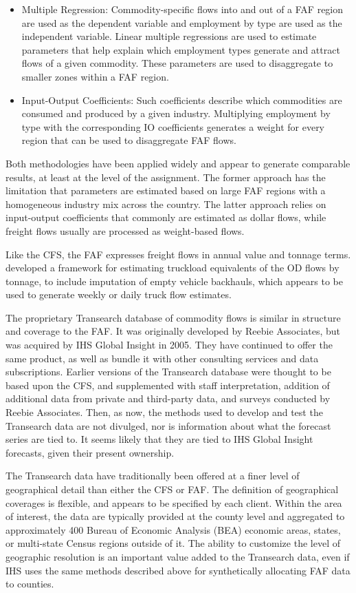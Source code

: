 \begin{itemize}
\item
Multiple Regression: Commodity-specific flows into and out of a FAF region are used as the dependent variable and employment by type are used as the independent variable. Linear multiple regressions are used to estimate parameters that help explain which employment types generate and attract flows of a given commodity. These parameters are used to disaggregate to smaller zones within a FAF region.
\item
Input-Output Coefficients: Such coefficients describe which commodities are consumed and produced by a given industry. Multiplying employment by type with the corresponding IO coefficients generates a weight for every region that can be used to disaggregate FAF flows.
\end{itemize}

Both methodologies have been applied widely and appear to generate comparable results, at least at the level of the assignment. The former approach has the limitation that parameters are estimated based on large FAF regions with a homogeneous industry mix across the country. The latter approach relies on input-output coefficients that commonly are estimated as dollar flows, while freight flows usually are processed as weight-based flows.

Like the CFS, the FAF expresses freight flows in annual value and tonnage terms. \cite{battelle12} developed a framework for estimating truckload equivalents of the OD flows by tonnage, to include imputation of empty vehicle backhauls, which appears to be used to generate weekly or daily truck flow estimates.

The proprietary Transearch database of commodity flows is similar in structure and coverage to the FAF. It was originally developed by Reebie Associates, but was acquired by IHS Global Insight in 2005. They have continued to offer the same product, as well as bundle it with other consulting services and data subscriptions. Earlier versions of the Transearch database were thought to be based upon the CFS, and supplemented with staff interpretation, addition of additional data from private and third-party data, and surveys conducted by Reebie Associates. Then, as now, the methods used to develop and test the Transearch data are not divulged, nor is information about what the forecast series are tied to. It seems likely that they are tied to IHS Global Insight forecasts, given their present ownership.

The Transearch data have traditionally been offered at a finer level of geographical detail than either the CFS or FAF. The definition of geographical coverages is flexible, and appears to be specified by each client. Within the area of interest, the data are typically provided at the county level and aggregated to approximately 400 Bureau of Economic Analysis (BEA) economic areas, states, or multi-state Census regions outside of it. The ability to customize the level of geographic resolution is an important value added to the Transearch data, even if IHS uses the same methods described above for synthetically allocating FAF data to counties.

